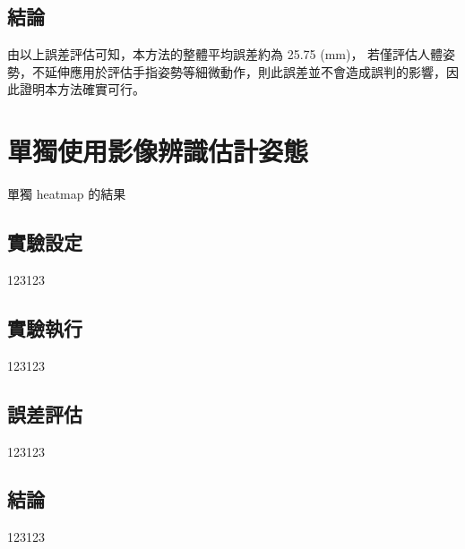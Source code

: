 \subsection{結論}
由以上誤差評估可知，本方法的整體平均誤差約為 25.75 (mm)，
若僅評估人體姿勢，不延伸應用於評估手指姿勢等細微動作，則此誤差並不會造成誤判的影響，因此證明本方法確實可行。

\clearpage

\section{單獨使用影像辨識估計姿態}
單獨 heatmap 的結果
\subsection{實驗設定}
123123
\subsection{實驗執行}
123123
\subsection{誤差評估}
123123
\subsection{結論}
123123



